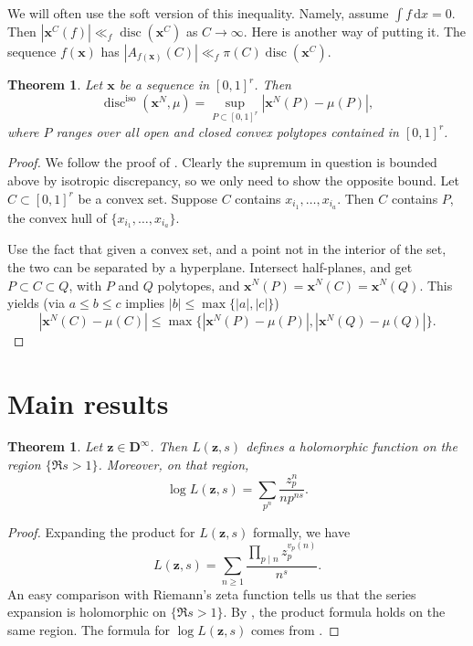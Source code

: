 \documentclass{article}
\DeclareMathOperator{\disc}{disc}
\newcommand{\bD}{\mathbf{D}}
\newcommand{\bx}{{\boldsymbol x}}
\newcommand{\bz}{{\boldsymbol z}}
\newcommand{\dd}{\mathrm{d}}
\newcommand{\iso}{\mathrm{iso}}
\newtheorem{theorem}[subsection]{Theorem}
\theoremstyle{definition}
\begin{document}
We will often use the soft version of this inequality. Namely, assume 
$\int f\, \dd x=0$. Then $|\bx^C(f)| \ll_f \disc(\bx^C)$ as $C\to \infty$. 
Here is another way of putting it. The sequence $f(\bx)$ has
$|A_{f(\bx)}(C)| \ll_f \pi(C) \disc(\bx^C)$. 

\begin{theorem}
Let $\bx$ be a sequence in $[0,1]^r$. Then 
\[
	\disc^\iso(\bx^N,\mu) = \sup_{P\subset [0,1]^r} \left| \bx^N(P)-\mu(P)\right| ,
\]
where $P$ ranges over all open and closed convex polytopes contained in 
$[0,1]^r$. 
\end{theorem}
\begin{proof}
We follow the proof of \cite[Ch.2~Th.1.5]{kuipers-niederreiter-1974}. Clearly 
the supremum in question is bounded above by isotropic discrepancy, so we only 
need to show the opposite bound. Let $C\subset [0,1]^r$ be a convex 
set. Suppose $C$ contains $x_{i_1},\dots,x_{i_a}$. Then $C$ contains $P$, the 
convex hull of $\{x_{i_1},\dots,x_{i_a}\}$. 

Use the fact that given a convex set, and a point not in the interior of the 
set, the two can be separated by a hyperplane. Intersect half-planes, and get 
$P\subset C\subset Q$, with $P$ and $Q$ polytopes, and 
$\bx^N(P)=\bx^N(C)=\bx^N(Q)$. This yields (via $a\leqslant b\leqslant c$ implies 
$|b|\leqslant\max\{|a|,|c|\}$)
\[
	|\bx^N(C)-\mu(C)| \leqslant \max\{|\bx^N(P)-\mu(P)|,|\bx^N(Q)-\mu(Q)|\} .
\]
\end{proof}





\section{Main results}\label{sec:prelim-result}

\begin{theorem}
Let $\bz\in \bD^\infty$. Then $L(\bz,s)$ defines a holomorphic 
function on the region $\{\Re s>1\}$. Moreover, on that region, 
\[
	\log L(\bz,s) = \sum_{p^n} \frac{z_p^n}{n p^{n s}} .
\]
\end{theorem}
\begin{proof}
Expanding the product for $L(\bz,s)$ formally, we have 
\[
	L(\bz,s) = \sum_{n\geqslant 1} \frac{\prod_{p\mid n} z_p^{v_p(n)}}{n^s} .
\]
An easy comparison with Riemann's zeta function tells us that the series 
expansion is holomorphic on $\{\Re s>1\}$. By \cite[Th.~11.7]{apostol-1976}, 
the product formula holds on the same region. The formula for 
$\log L(\bz,s)$ comes from \cite[11.9 Ex.2]{apostol-1976}.
\end{proof}
\end{document}
